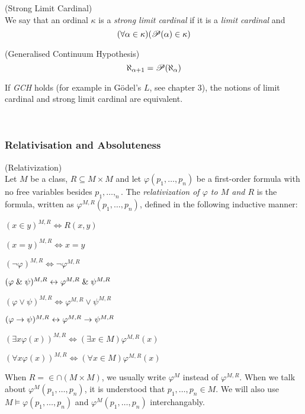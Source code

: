 \begin{definition}{(Strong Limit Cardinal)}\label{def:strong_limit_cardinal}\\
We say that an ordinal $\kappa$ is a \emph{strong limit cardinal} if it is a \emph{limit cardinal} and 
\begin{equation}
(\forall \alpha \in \kappa)(\mathscr{P} (\alpha) \in \kappa)
\end{equation}
\end{definition}

\begin{definition}{(Generalised Continuum Hypothesis)}\label{def:gch}\\
\begin{equation}
\aleph_{\alpha+1}=\mathscr{P} (\aleph_\alpha)
\end{equation}
\end{definition}
If \emph{GCH} holds (for example in Gödel's $L$, see chapter 3), the notions of limit cardinal and strong limit cardinal are equivalent.

\

\subsubsection{Relativisation and Absoluteness}
\begin{definition}{(Relativization)}\label{def:relativization}\\
Let $M$ be a class, $R \subseteq M\times M$ and let $\varphi(p_1, \ldots, p_n)$ be a first-order formula with no free variables besides $p_1, \ldots, _n$. 
The \emph{relativization of $\varphi$ to $M$ and $R$} is the formula, written as $\varphi^{M, R}(p_1, \ldots, p_n)$, defined in the following inductive manner:
\bce[(i)]
\item $(x \in y)^{M,R} \iff R(x, y)$
\item $(x = y)^{M,R} \iff x = y$
\item $(\neg \varphi)^{M,R} \iff \neg \varphi^{M,R}$
\item $(\varphi \mathrel{\&} \psi)^{M,R} \leftrightarrow \varphi^{M,R} \mathrel{\&} \psi^{M,R}$
\item $(\varphi \lor \psi)^{M,R} \iff \varphi^{M,R} \lor \psi^{M,R}$
\item $(\varphi \rightarrow \psi)^{M,R} \leftrightarrow \varphi^{M,R} \rightarrow \psi^{M,R}$
\item $(\exists x \varphi(x))^{M,R} \iff (\exists x \in M) \varphi^{M,R}(x)$
\item $(\forall x \varphi(x))^{M,R} \iff (\forall x \in M) \varphi^{M,R}(x)$
\ece
\end{definition}
When $R=\in\cap(M \times M)$, we usually write $\varphi^M$ instead of $\varphi^{M, R}$. When we talk about $\varphi^M(p_1, \ldots, p_n)$, it is understood that $p_1, \ldots, p_n \in M$.
We will also use $M \models \varphi(p_1, \ldots, p_n)$ and $\varphi^M(p_1, \ldots, p_n)$ interchangably.

